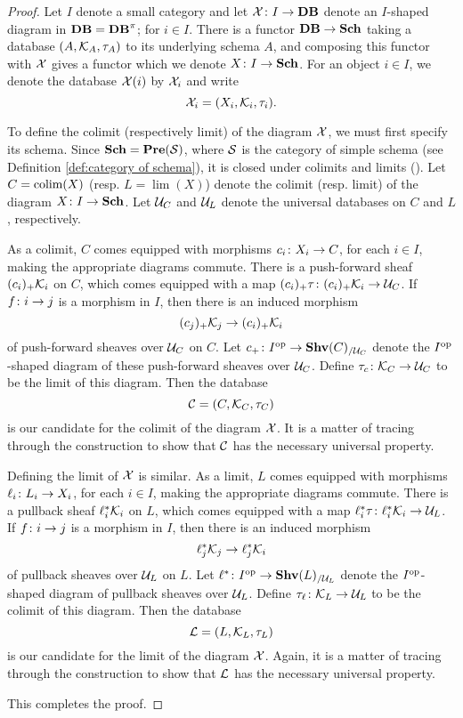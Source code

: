 \documentclass{amsart}
\def\Sch{{\bf Sch}}
\def\Data{{\bf DB}}
\begin{document}
\begin{proof}

Let $I$ denote a small category and let $\mcX\taking I\to\Data$ denote an $I$-shaped diagram in $\Data=\Data^\pi$; for $i\in I$.  There is a functor $\Data\to\Sch$ taking a database $(A,\mathcal{K}_A,\tau_A)$ to its underlying schema $A$, and composing this functor with $\mathcal{X}$ gives a functor which we denote $X\taking I\to\Sch$.  For an object $i\in I$, we denote the database $\mathcal{X}(i)$ by $\mathcal{X}_i$ and write $$\mathcal{X}_i=(X_i,\mathcal{K}_i,\tau_i).$$

To define the colimit (respectively limit) of the diagram $\mathcal{X}$, we must first specify its schema.  Since $\Sch=\Pre(\mcS)$, where $\mathcal{S}$ is the category of simple schema (see Definition \ref{def:category of schema}), it is closed under colimits and limits (\cite[p. 22]{MM}).  Let $C=\mathop{\textnormal{colim}}(X)$ (resp. $L=\lim(X)$) denote the colimit (resp. limit) of the diagram $X\taking I\to\Sch$.  Let $\mathcal{U}_C$ and $\mathcal{U}_L$ denote the universal databases on $C$ and $L$, respectively.

As a colimit, $C$ comes equipped with morphisms $c_i\colon X_i\rightarrow C$, for each $i\in I$, making the appropriate diagrams commute.  There is a push-forward sheaf $(c_i)_+\mathcal{K}_i$ on $C$, which comes equipped with a map $(c_i)_+\tau\colon (c_i)_+\mathcal{K}_i\rightarrow\mathcal{U}_C$.  If $f\colon i\rightarrow j$ is a morphism in $I$, then there is an induced morphism $$(c_j)_+\mathcal{K}_j\rightarrow (c_i)_+\mathcal{K}_i$$ of push-forward sheaves over $\mathcal{U}_C$ on $C$.  Let $c_+\colon I^\textnormal{op}\rightarrow{\bf Shv}(C)_{/\mathcal{U}_C}$ denote the $I^\textnormal{op}$-shaped diagram of these push-forward sheaves over $\mathcal{U}_C$.  Define $\tau_c\colon\mathcal{K}_C\rightarrow\mathcal{U}_C$ to be the limit of this diagram.  Then the database $$\mathcal{C}=(C,\mathcal{K}_C,\tau_C)$$ is our candidate for the colimit of the diagram $\mathcal{X}$.  It is a matter of tracing through the construction to show that $\mathcal{C}$ has the necessary universal property.

Defining the limit of $\mathcal{X}$ is similar.  As a limit, $L$ comes equipped with morphisms $\ell_i\colon L_i\rightarrow X_i$, for each $i\in I$, making the appropriate diagrams commute.  There is a pullback sheaf $\ell_i^*\mathcal{K}_i$ on $L$, which comes equipped with a map $\ell_i^*\tau\colon\ell_i^*\mathcal{K}_i\rightarrow\mathcal{U}_L$.  If $f\colon i\rightarrow j$ is a morphism in $I$, then there is an induced morphism $$\ell_j^*\mathcal{K}_j\rightarrow\ell_j^*\mathcal{K}_i$$ of pullback sheaves over $\mathcal{U}_L$ on $L$.  Let $\ell^*\colon I^\textnormal{op}\rightarrow{\bf Shv}(L)_{/\mathcal{U}_L}$ denote the $I^\textnormal{op}$-shaped diagram of pullback sheaves over $\mathcal{U}_L$.  Define $\tau_\ell\colon\mathcal{K}_L\rightarrow\mathcal{U}_L$ to be the colimit of this diagram.  Then the database $$\mathcal{L}=(L,\mathcal{K}_L,\tau_L)$$ is our candidate for the limit of the diagram $\mathcal{X}$.  Again, it is a matter of tracing through the construction to show that $\mathcal{L}$ has the necessary universal property.  

This completes the proof.

\end{proof}
\end{document}
